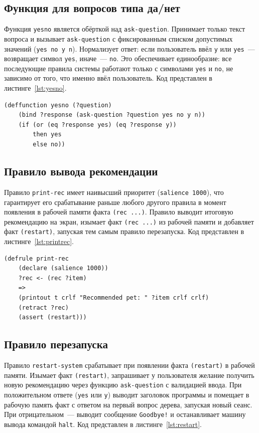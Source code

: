 \documentclass[a4paper,final]{article}
\begin{document}
\subsection{Функция для вопросов типа да/нет}

Функция \texttt{yesno} является обёрткой над \texttt{ask-question}. Принимает только текст вопроса и вызывает \texttt{ask-question} с фиксированным списком допустимых значений (\texttt{yes no y n}). Нормализует ответ: если пользователь ввёл \texttt{y} или \texttt{yes}~--- возвращает символ \texttt{yes}, иначе~--- \texttt{no}. Это обеспечивает единообразие: все последующие правила системы работают только с символами \texttt{yes} и \texttt{no}, не зависимо от того, что именно ввёл пользователь. Код представлен в листинге~\ref{lst:yesno}.

\begin{lstlisting}[language=CLIPS,
	caption={Функция yesno},
	label=lst:yesno]
(deffunction yesno (?question)
    (bind ?response (ask-question ?question yes no y n))
    (if (or (eq ?response yes) (eq ?response y))
        then yes
        else no))
\end{lstlisting}

\subsection{Правило вывода рекомендации}

Правило \texttt{print-rec} имеет наивысший приоритет (\texttt{salience~1000}), что гарантирует его срабатывание раньше любого другого правила в момент появления в рабочей памяти факта \texttt{(rec~...)}. Правило выводит итоговую рекомендацию на экран, изымает факт \texttt{(rec~...)} из рабочей памяти и добавляет факт \texttt{(restart)}, запуская тем самым правило перезапуска. Код представлен в листинге~\ref{lst:printrec}.

\begin{lstlisting}[language=CLIPS,
	caption={Правило print-rec},
	label=lst:printrec]
(defrule print-rec
    (declare (salience 1000))
    ?rec <- (rec ?item)
    =>
    (printout t crlf "Recommended pet: " ?item crlf crlf)
    (retract ?rec)
    (assert (restart)))
\end{lstlisting}

\subsection{Правило перезапуска}

Правило \texttt{restart-system} срабатывает при появлении факта \texttt{(restart)} в рабочей памяти. Изымает факт \texttt{(restart)}, запрашивает у пользователя желание получить новую рекомендацию через функцию \texttt{ask-question} с валидацией ввода. При положительном ответе (\texttt{yes} или \texttt{y}) выводит заголовок программы и помещает в рабочую память факт с ответом на первый вопрос дерева, запуская новый сеанс. При отрицательном~--- выводит сообщение \texttt{Goodbye!} и останавливает машину вывода командой \texttt{halt}. Код представлен в листинге~\ref{lst:restart}.
\end{document}
